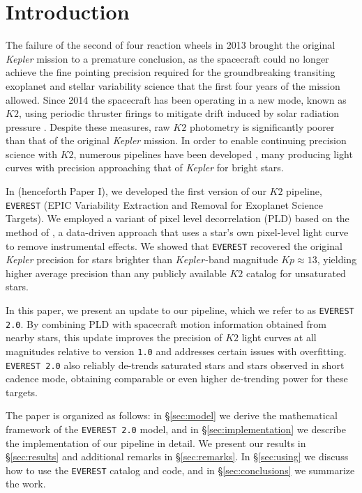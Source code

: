 \documentclass[]{emulateapj}
\newcommand{\Kp}{\ensuremath{Kp}}
\newcommand{\edited}[1]{{\color{red} #1}}
\begin{document}

\section{Introduction}
\label{sec:intro}
The failure of the second of four reaction wheels in 2013 brought the original
\emph{Kepler} mission to a premature conclusion, as the spacecraft could no longer
achieve the fine pointing precision required for the groundbreaking
transiting exoplanet and stellar variability science that the first four years of the
mission allowed. Since 2014 the spacecraft has been operating in a new mode, known
as $K2$, \edited{using periodic thruster firings to mitigate drift induced by solar radiation pressure}
\citep{Howell14}. Despite these measures, raw $K2$ photometry is significantly
poorer than that of the original \emph{Kepler} mission. In order to enable
continuing precision science with $K2$, numerous pipelines have been developed
\citep[e.g.,][]{VanderburgJohnson14,Armstrong15,Lund15,Crossfield15,
ForemanMackey15,Huang15,Aigrain16,Libralato2016a,Libralato2016b},
many producing light curves with precision approaching that of \emph{Kepler} for
bright stars.

In \cite{Luger16} (henceforth Paper I), we developed the first version of our
$K2$ pipeline, \texttt{EVEREST} (EPIC Variability Extraction and Removal for Exoplanet
Science Targets).
We employed a variant of pixel level decorrelation (PLD) based on the method of \cite{Deming15},
a data-driven approach that uses a star's own pixel-level light curve to remove
instrumental effects. We showed that \texttt{EVEREST} recovered the original \emph{Kepler}
precision for stars brighter than $Kepler$-band magnitude $\Kp \approx 13$, yielding higher
average precision than any publicly available $K2$ catalog for unsaturated stars.

In this paper, we present an update to our pipeline, which we refer to as \texttt{EVEREST 2.0}.
By combining PLD with spacecraft motion information obtained from nearby stars,
this update improves the precision of $K2$ light curves at all magnitudes relative to version \texttt{1.0} and addresses
certain issues with overfitting. \texttt{EVEREST 2.0} also reliably de-trends saturated
stars and stars observed in short cadence mode, obtaining comparable or even higher de-trending
power for these targets.

The paper is organized as follows: in \S\ref{sec:model} we derive the mathematical
framework of the \texttt{EVEREST 2.0} model, and in \S\ref{sec:implementation} we describe
the implementation of our pipeline in detail. We present our results in \S\ref{sec:results}
and additional remarks in \S\ref{sec:remarks}. In \S\ref{sec:using} we discuss how
to use the \texttt{EVEREST} catalog and code, and in \S\ref{sec:conclusions} we
summarize the work.
\end{document}
